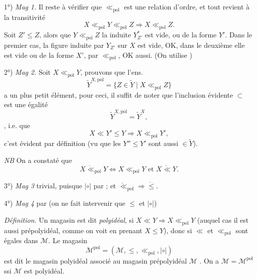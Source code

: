 \documentclass[11pt,a4paper]{article}
\begin{document}
1°) \emph{Mag 1.} Il reste à vérifier que $\ll_{\mathrm{pol}}$ est une relation
d'ordre, et tout revient à la transitivité
\[
  X \ll_{\mathrm{pol}} Y \ll_{\mathrm{pol}} Z \Longrightarrow X \ll_{\mathrm{pol}} Z .
\]
Soit $Z' \leq Z$, alors que $Y \ll_{\mathrm{pol}} Z$ \struck{\ill{}} la
 induite $Y^{*}_{Z'}$ est vide, ou de la forme $Y'$. Dans
le premier cas, la figure induite par $Y_{Z'}$ sur $X$ est vide, OK, dans le
deuxième elle est vide ou de la forme $X'$, par $\ll_{\mathrm{pol}}$, OK aussi.
(On utilise  \ill{} \ill{})

2°) \emph{Mag 2.} Soit $X \ll_{\mathrm{pol}} Y$, prouvons que l'ens.
\[
  \widetilde{Y}^{X,\mathrm{pol}} = \{ Z \in \widetilde{Y} \mid X \ll_{\mathrm{pol}} Z \}
\]
a un plus petit élément, pour ceci, il suffit de noter que l'inclusion
évidente $\subset$ est une égalité
\[
  \widetilde{Y}^{X,\mathrm{pol}} = \widetilde{Y}^{X} ,
\]
, i.e. que 
\[
  X \ll Y' \leq Y \Longrightarrow X \ll_{\mathrm{pol}} Y' ,
\]
c'est évident par définition (vu que les $Y'' \leq Y'$ sont aussi
$\in \widetilde{Y}$).

\struck{\ill{}} \emph{NB} On a constaté que
\[
  X \mathrel{\mathring{\ll}_{\mathrm{pol}}} Y \Longleftrightarrow
  X \ll_{\mathrm{pol}} Y \text{ et } X \mathrel{\mathring{\ll}} Y .
\]

3°) \emph{Mag 3} \ill{} trivial, puisque $|\circ|$  par
 ; et $\mathring{\ll}_{\mathrm{pol}} \Rightarrow \mathring{\leq}$.

4°) \emph{Mag 4}   par  (on ne
fait intervenir que $\leq$ et $|\circ|$)

\emph{Définition.} Un magasin est dit \struck{\ill{}} \emph{polyidéal}, si
$X \ll Y \Rightarrow X \ll_{\mathrm{pol}} Y$ (auquel cas il est 
aussi prépolyidéal, comme on voit en prenant $X \leq Y$),
 donc si $\ll$ et
$\ll_{\mathrm{pol}}$ sont égales dans $\mathcal{M}$. Le magasin
\[
  \mathcal{M}^{\mathrm{pol}} = (\mathcal{M}, \leq, \ll_{\mathrm{pol}}, |\circ|)
\]
est dit le magasin polyidéal associé au magasin prépolyidéal $\mathcal{M}$
. On a 
$\mathcal{M} = \mathcal{M}^{\mathrm{pol}}$ ssi $\mathcal{M}$ est polyidéal.
\end{document}
